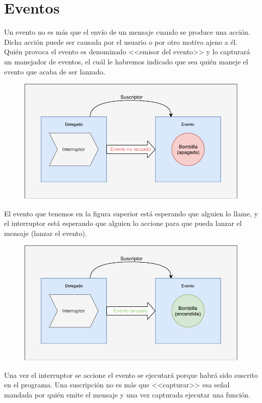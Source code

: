 \documentclass[11pt, oneside]{book}		%
\begin{document}
\chapter{Eventos}
Un evento\cite{msdn:evento} no es más que el envío de un mensaje cuando se produce una acción. Dicha acción puede ser causada por el usuario o por otro motivo ajeno a él. Quién provoca el evento es denominado <<emisor del evento>> y lo capturará un manejador de eventos, el cuál le habremos indicado que sea quién maneje el evento que acaba de ser lanzado.
\begin{figure}[H]
	\centering
	\includegraphics{img/Eventos/eventoEsquema1.pdf}
\end{figure}
El evento que tenemos en la figura superior está esperando que alguien lo llame, y el interruptor está esperando que alguien lo accione para que pueda lanzar el mensaje (lanzar el evento). 
\begin{figure}[H]
	\centering
	\includegraphics{img/Eventos/eventoEsquema2.pdf}
\end{figure}
Una vez el interruptor se accione el evento se ejecutará porque habrá sido suscrito en el programa. Una suscripción no es más que <<capturar>> esa señal mandada por quién emite el mensaje y una vez capturada ejecutar una función.\\
\end{document}
